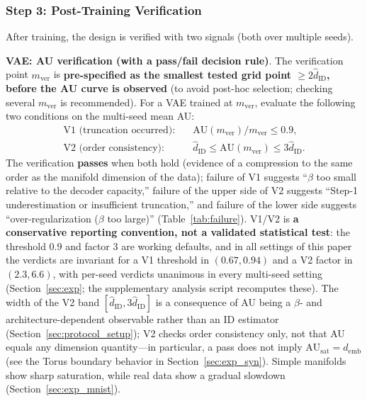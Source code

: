 \documentclass[make,article,submit,pdftex,moreauthors]{Definitions/mdpi}
\newcommand{\hatdID}{\hat{d}_{\mathrm{ID}}}
\newcommand{\AUsat}{\mathrm{AU}_{\mathrm{sat}}}
\newcommand{\demb}{d_{\mathrm{emb}}}
\begin{document}
\subsubsection{Step 3: Post-Training Verification}\label{sec:protocol_s3}

After training, the design is verified with two signals (both over multiple
seeds).

\textbf{VAE: AU verification (with a pass/fail decision rule)}.
The verification point $m_{\mathrm{ver}}$ is \textbf{pre-specified as the
smallest tested grid point $\geq 2\hatdID$, before the AU curve is
observed} (to avoid post-hoc selection; checking several
$m_{\mathrm{ver}}$ is recommended).
For a VAE trained at $m_{\mathrm{ver}}$, evaluate the following two
conditions on the multi-seed mean AU:
\begin{align}
  \text{V1 (truncation occurred)}:&\quad
  \mathrm{AU}(m_{\mathrm{ver}}) / m_{\mathrm{ver}} \leq 0.9,
  \label{eq:rule_v1}\\
  \text{V2 (order consistency)}:&\quad
  \hatdID \leq \mathrm{AU}(m_{\mathrm{ver}}) \leq 3\hatdID.
  \label{eq:rule_v2}
\end{align}
The verification \textbf{passes} when both hold (evidence of a compression
to the same order as the manifold dimension of the data);
failure of V1 suggests ``$\beta$ too small relative to the decoder
capacity,'' failure of the upper side of V2 suggests ``Step-1
underestimation or insufficient truncation,'' and failure of the lower side
suggests ``over-regularization ($\beta$ too large)''
(Table~\ref{tab:failure}).
V1/V2 is \textbf{a conservative reporting convention, not a validated
statistical test}: the threshold $0.9$ and factor $3$ are working defaults,
and in all settings of this paper the verdicts are invariant for a V1
threshold in $(0.67, 0.94)$ and a V2 factor in $(2.3, 6.6)$, with per-seed
verdicts unanimous in every multi-seed setting (Section~\ref{sec:exp}; the
supplementary analysis script recomputes these).
The width of the V2 band $[\hatdID, 3\hatdID]$ is a consequence of AU being
a $\beta$- and architecture-dependent observable rather than an ID
estimator (Section~\ref{sec:protocol_setup}); V2 checks order consistency
only, not that AU equals any dimension quantity---in particular, a pass
does not imply $\AUsat = \demb$ (see the Torus boundary behavior in
Section~\ref{sec:exp_syn}).
Simple manifolds show sharp saturation, while real data show a gradual
slowdown (Section~\ref{sec:exp_mnist}).
\end{document}
